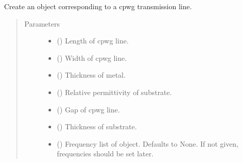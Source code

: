 \documentclass[letterpaper,10pt,english]{sphinxmanual}
\begin{document}
\begin{fulllineitems}
\begin{fulllineitems}
\end{fulllineitems}


\begin{fulllineitems}
\label{\detokenize{touchstone:touchstone.spfile.cpwgline}}
Create an  object corresponding to a cpwg transmission line.
\begin{quote}\begin{description}
\item[{Parameters}] \leavevmode\begin{itemize}
\item {} 
 () \textendash{} Length of cpwg line.

\item {} 
 () \textendash{} Width of cpwg line.

\item {} 
 () \textendash{} Thickness of metal.

\item {} 
 () \textendash{} Relative permittivity of substrate.

\item {} 
 () \textendash{} Gap of cpwg line.

\item {} 
 () \textendash{} Thickness of substrate.

\item {} 
 (\sphinxstyleliteralemphasis{\sphinxupquote{, }}) \textendash{} Frequency list of object. Defaults to None. If not given, frequencies should be set later.


\end{itemize}
\end{description}
\end{quote}
\end{fulllineitems}
\end{fulllineitems}
\end{document}
